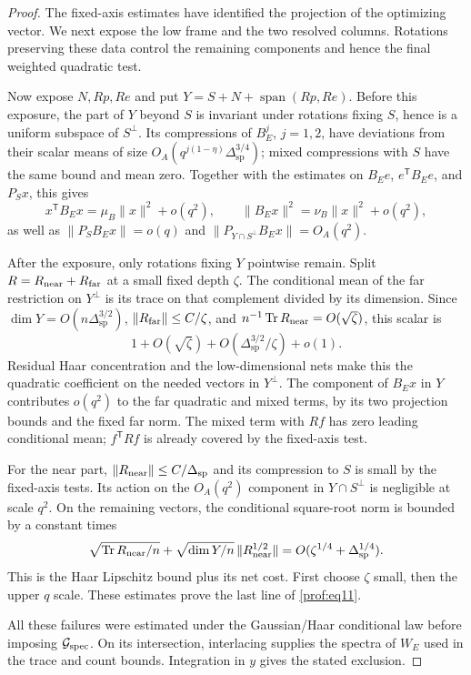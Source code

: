 \begin{proof}
The fixed-axis estimates have identified the projection of the
optimizing vector. We next expose the low frame and the two resolved
columns. Rotations preserving these data control the remaining
components and hence the final weighted quadratic test.

Now expose $N,Rp,Re$ and put
$Y=S+N+\operatorname{span}(Rp,Re)$. Before this exposure, the part of
$Y$ beyond $S$ is invariant under rotations fixing $S$, hence is a
uniform subspace of $S^\perp$. Its compressions of $B_E^j$, $j=1,2$,
have deviations from their scalar means of size
$O_A(q^{j(1-\eta)}\Delta_{\mathrm{sp}}^{3/4})$; mixed compressions
with $S$ have the same bound and mean zero. Together with the estimates
on $B_Ee$, $e^{\mathsf T}B_Ee$, and $P_Sx$, this gives
\[
 x^{\mathsf T}B_Ex=\mu_B\|x\|^2+o(q^2),\qquad
 \|B_Ex\|^2=\nu_B\|x\|^2+o(q^2),
\]
as well as
$\|P_SB_Ex\|=o(q)$ and
$\|P_{Y\cap S^\perp}B_Ex\|=O_A(q^2)$.

After the exposure, only rotations fixing $Y$ pointwise remain.
Split $R=R_{\rm near}+R_{\rm far}$ at a small fixed depth $\zeta$.
The conditional mean of the far restriction on $Y^\perp$ is its
trace on that complement divided by its dimension. Since
$\dim Y=O(n\Delta_{\mathrm{sp}}^{3/2})$,
$\|R_{\rm far}\|\le C/\zeta$, and
$n^{-1}\operatorname{Tr} R_{\rm near}=O(\sqrt\zeta)$, this scalar is
\[
 1+O(\sqrt\zeta)+O(\Delta_{\mathrm{sp}}^{3/2}/\zeta)+o(1).
\]
Residual Haar concentration and the low-dimensional nets make this
the quadratic coefficient on the needed vectors in $Y^\perp$.
The component of $B_Ex$ in $Y$ contributes $o(q^2)$ to the far
quadratic and mixed terms, by its two projection bounds and the fixed
far norm. The mixed term with $Rf$ has zero leading conditional mean;
$f^{\mathsf T}Rf$ is already covered by the fixed-axis test.

For the near part, $\|R_{\rm near}\|\le C/\Delta_{\mathrm{sp}}$ and
its compression to $S$ is small by the fixed-axis tests. Its action
on the $O_A(q^2)$ component in $Y\cap S^\perp$ is negligible at
scale $q^2$. On the remaining vectors, the conditional square-root
norm is bounded by a constant times
\[
 \sqrt{\operatorname{Tr} R_{\rm near}/n}
 +\sqrt{\dim Y/n}\,\|R_{\rm near}^{1/2}\|
 =O(\zeta^{1/4}+\Delta_{\mathrm{sp}}^{1/4}).
\]
This is the Haar Lipschitz bound plus its net cost. First choose
$\zeta$ small, then the upper $q$ scale. These estimates prove the
last line of \eqref{prof:eq11}.

All these failures were estimated under the Gaussian/Haar conditional
law before imposing $\mathcal G_{\rm spec}$. On its intersection,
interlacing supplies the spectra of $W_E$ used in the trace and count
bounds. Integration in $y$ gives the stated exclusion.


\end{proof}
